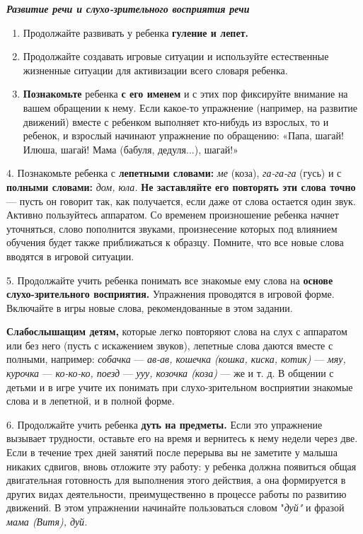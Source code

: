 \documentclass[a5paper]{book}
\renewcommand{\emph}[1]{\textit{#1}}
\begin{document}
\emph{\textbf{Развитие речи и слухо-зрительного восприятия речи}}


\begin{enumerate}
\def\labelenumi{\arabic{enumi}.}
\item
  
  Продолжайте развивать у ребенка \textbf{гуление и лепет.}
  
\item
  
  Продолжайте создавать игровые ситуации и используйте естественные
  жизненные ситуации для активизации всего словаря ребенка.
  
\item
  
  \textbf{Познакомьте} ребенка \textbf{с его именем} и с этих пор
  фиксируйте внимание на вашем обращении к нему. Если какое-то
  упражнение (например, на развитие движений) вместе с ребенком
  выполняет кто-нибудь из взрослых, то и ребенок, и взрослый начинают
  упражнение по обращению: «Папа, шагай! Илюша, шагай! Мама (бабуля,
  дедуля...), шагай!»
  
\end{enumerate}


4. Познакомьте ребенка с \textbf{лепетными словами:} \emph{ме} (коза),
\emph{га-га-га} (гусь) и с \textbf{полными словами:} \emph{дом, юла.}
\textbf{Не заставляйте его повторять эти слова точно} --- пусть он
говорит так, как получается, если даже от слова остается один звук.
Активно пользуйтесь аппаратом. Со временем произношение ребенка начнет
уточняться, слово пополнится звуками, произнесение которых под влиянием
обучения будет также приближаться к образцу. Помните, что все новые
слова вводятся в игровой ситуации.

5. Продолжайте учить ребенка понимать все знакомые ему слова на
\textbf{основе слухо-зрительного восприятия.} Упражнения проводятся в
игровой форме. Включайте в игры новые слова, рекомендованные в этом
задании.

\textbf{Слабослышащим детям,} которые легко повторяют слова на слух с
аппаратом или без него (пусть с искажением звуков), лепетные слова
даются вместе с полными, например: \emph{собачка} --- \emph{ав-ав,
кошечка (кошка, киска, котик)} --- \emph{мяу, курочка} ---
\emph{ко-ко-ко, поезд} --- \emph{ууу, козочка (коза)} --- же и т. д. В
общении с детьми и в игре учите их понимать при слухо-зрительном
восприятии знакомые слова и в лепетной, и в полной форме.

6. Продолжайте учить ребенка \textbf{дуть на предметы.} Если это
упражнение вызывает трудности, оставьте его на время и вернитесь к нему
недели через две. Если в течение трех дней занятий после перерыва вы не
заметите у малыша никаких сдвигов, вновь отложите эту работу: у ребенка
должна появиться общая двигательная готовность для выполнения этого
действия, а она формируется в других видах деятельности, преимущественно
в процессе работы по развитию движений. В этом упражнении начинайте
пользоваться словом "\emph{дуй"} и фразой \emph{мама (Витя), дуй.}
\end{document}
